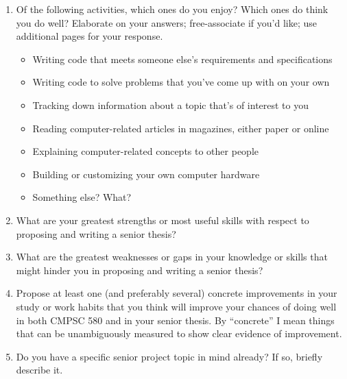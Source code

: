 \begin{enumerate}
\item
Of the following activities, which ones do you enjoy? Which ones do think
you do well? Elaborate on your answers; free-associate if you'd like; 
use additional pages for your response.
\begin{itemize}
\item Writing code that meets someone else's
requirements and specifications
\item Writing code to solve problems that you've come up with on your own 
\item Tracking down information about a topic that's of interest to you
\item Reading computer-related articles in magazines, either
paper or online
\item Explaining computer-related concepts to other people
\item Building or customizing your own computer hardware
\item Something else? What?
\end{itemize}

\newpage

\item
What are your greatest strengths or most useful skills 
with respect to proposing and writing a senior thesis?

\vspace{1.5in}

\item
What are the greatest weaknesses or gaps in your knowledge 
or skills that might hinder you in proposing and writing 
a senior thesis?

\vspace{1.5in}

\item
Propose at least one (and preferably several) concrete 
improvements in your study or work habits that you think 
will improve your chances of doing well in both CMPSC 580 
and in your senior thesis. By ``concrete'' I mean things 
that can be unambiguously measured to show clear evidence of
improvement.

\vspace{1.5in}

\item
Do you have a specific senior project topic in mind already? If so,
briefly describe it.

\end{enumerate}


